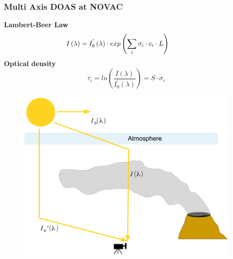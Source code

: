 \documentclass{beamer} %
\begin{document}
	\begin{frame}
\frametitle{\color{mygreen}Multi Axis DOAS at NOVAC\\%
	\color{mygreen}{\rule{0.8\textwidth}{2pt}}}

\vspace{-1cm}
\begin{block}{}
	\begin{multicols}{2}
		\textbf{Lambert-Beer Law} \\
		\vspace{-0.5cm}
		\begin{equation*}
		\hspace*{-0.9cm}I\left(\lambda \right) = I^{'}_{0}\left(\lambda\right)\cdot exp\left(\sum_{i}\sigma_{i}\cdot c_{i}\cdot L \right)
		\end{equation*}
		\textbf{Optical density}
		\vspace{-0.5cm}
		\begin{equation*}
		\tau_{i} = ln\left(\frac{I(\lambda)}{I^{'}_{0}\left(\lambda\right)}\right) = S\cdot\sigma_{i}
		\end{equation*}
	\end{multicols}	
\end{block}
\begin{multicols}{2}
	\begin{figure}
		\centering
		\includegraphics[width=1\linewidth]{../../Bilder/DOASFunction}
		\label{fig:doasfunction}
	\end{figure}
	\begin{figure}
		\centering

\end{figure}
\end{multicols}
\end{frame}
\end{document}
